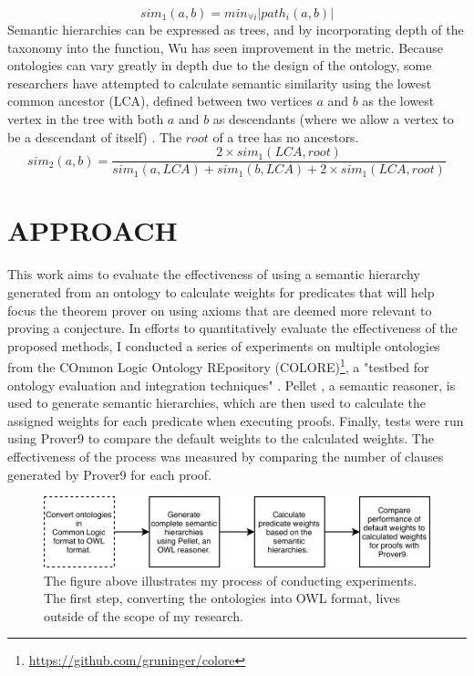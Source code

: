 \documentclass{article}
\begin{document}
\begin{equation}
sim_1(a,b)=min_{\forall i}\lvert{path_i(a,b)}\rvert
\label{rada}
\end{equation}
Semantic hierarchies can be expressed as trees, and by incorporating depth of the taxonomy into the function, Wu \cite{wu1994verbs} has seen improvement in the metric. Because ontologies can vary greatly in depth due to the design of the ontology, some researchers have attempted to calculate semantic similarity using the lowest common ancestor (LCA), defined between two vertices $a$ and $b$ as the lowest vertex in the tree with both $a$ and $b$ as descendants (where we allow a vertex to be a descendant of itself) \cite{wu1994verbs}. The $root$ of a tree has no ancestors. 
\begin{equation}
sim_2(a,b)=\frac{2 \times sim_1(LCA,root)}{sim_1(a,LCA)+sim_1(b,LCA)+2 \times sim_1(LCA,root)}
\label{wu}
\end{equation}

\newpage
\vspace*{.05in}
\section{\MakeUppercase{Approach}}
This work aims to evaluate the effectiveness of using a semantic hierarchy generated from an ontology to calculate weights for predicates that will help focus the theorem prover on using axioms that are deemed more relevant to proving a conjecture. In efforts to quantitatively evaluate the effectiveness of the proposed methods, I conducted a series of experiments on multiple ontologies from the COmmon Logic Ontology REpository (COLORE)\footnote{\url{https://github.com/gruninger/colore}}, a "testbed for ontology evaluation and integration techniques" \cite{gruninger2012specifying}. Pellet \cite{sirin2007pellet}, a semantic reasoner, is used to generate semantic hierarchies, which are then used to calculate the assigned weights for each predicate when executing proofs. Finally, tests were run using Prover9 \cite{mccune2005prover9} to compare the default weights to the calculated weights. The effectiveness of the process was measured by comparing the number of clauses generated by Prover9 for each proof. 

\begin{figure}[h]
\centering
\includegraphics[width=6in]{flowchart}
\caption[Approach]{The figure above illustrates my process of conducting experiments. The first step, converting the ontologies into OWL format, lives outside of the scope of my research.}
\label{fig:flowchart}
\end{figure}
\end{document}
